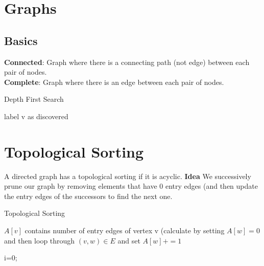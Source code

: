 \documentclass[9pt,landscape,a4paper, table]{extarticle}
\begin{document}
\begin{multicols*}{3}
\section{Graphs}

\subsection{Basics}

\textbf{Connected}: Graph where there is a connecting path (not edge) between each pair of nodes.\\
\textbf{Complete}: Graph where there is an edge between each pair of nodes. 



{\scriptsize
\begin{algorithm}[H]
    \caption{Depth First Search}
    
    \SetAlgoLined
    label v as discovered\\

\end{algorithm}}

\section{Topological Sorting} {
A directed graph has a topological sorting if it is acyclic. \textbf{Idea} We successively prune our graph by removing elements that have 0 entry edges (and then update the entry edges of the successors to find the next one.

{\scriptsize
\begin{algorithm}[H]
    \caption{Topological Sorting}
    
    \SetAlgoLined

$A[v]$ contains number of entry edges of vertex v (calculate by setting $A[w] = 0$ and then loop through $(v, w) \in E$ and set $A[w] += 1$ 

i=0;

\end{algorithm}}}
\end{multicols*}
\end{document}
